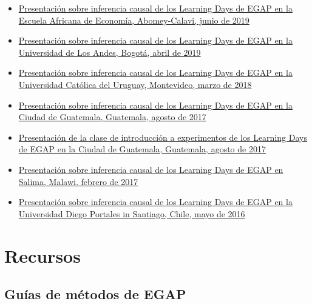 \documentclass[12pt,spanish,]{book}
\begin{document}
\begin{itemize}
\item
  \href{https://egap.github.io/learningdays-resources/Slides/Examples/causality-benin.pdf}{Presentación sobre inferencia causal de los Learning Days de EGAP en la Escuela Africana de Economía, Abomey-Calavi, junio de 2019}
\item
  \href{https://egap.github.io/learningdays-resources/Slides/Examples/causality-bogota.pdf}{Presentación sobre inferencia causal de los Learning Days de EGAP en la Universidad de Los Andes, Bogotá, abril de 2019}
\item
  \href{https://egap.github.io/learningdays-resources/Slides/Examples/causality-montevideo.pdf}{Presentación sobre inferencia causal de los Learning Days de EGAP en la Universidad Católica del Uruguay, Montevideo, marzo de 2018}
\item
  \href{https://egap.github.io/learningdays-resources/Slides/Examples/causality-guatemala.pdf}{Presentación sobre inferencia causal de los Learning Days de EGAP en la Ciudad de Guatemala, Guatemala, agosto de 2017}
\item
  \href{https://egap.github.io/learningdays-resources/Slides/Examples/intro_experiments-guatemala.pdf}{Presentación de la clase de introducción a experimentos de los Learning Days de EGAP en la Ciudad de Guatemala, Guatemala, agosto de 2017}
\item
  \href{https://egap.github.io/learningdays-resources/Slides/Examples/causality-malawi.pdf}{Presentación sobre inferencia causal de los Learning Days de EGAP en Salima, Malawi, febrero de 2017}
\item
  \href{https://egap.github.io/learningdays-resources/Slides/Examples/causality-santiago.pdf}{Presentación sobre inferencia causal de los Learning Days de EGAP en la Universidad Diego Portales in Santiago, Chile, mayo de 2016}
\end{itemize}

\hypertarget{recursos-1}{%
\section{Recursos}\label{recursos-1}}

\hypertarget{guuxedas-de-muxe9todos-de-egap}{%
\subsection{Guías de métodos de EGAP}\label{guuxedas-de-muxe9todos-de-egap}}
\end{document}
